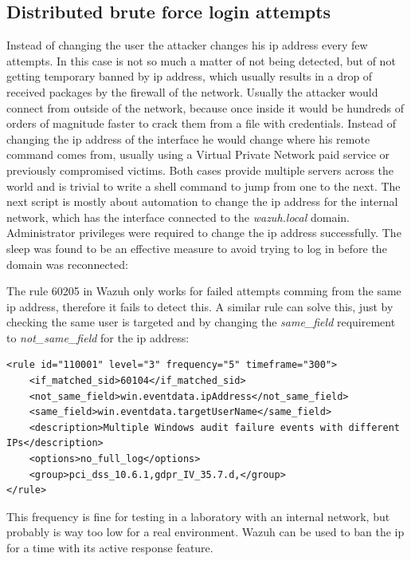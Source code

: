 \subsection{Distributed brute force login attempts}
Instead of changing the user the attacker changes his ip address every few attempts. In this case is not so much a matter of not being detected, but of not getting temporary banned by ip address, which usually results in a drop of received packages by the firewall of the network.
\linej
\linej
Usually the attacker would connect from outside of the network, because once inside it would be hundreds of orders of magnitude faster to crack them from a file with credentials.
Instead of changing the ip address of the interface he would change where his remote command comes from, usually using a Virtual Private Network paid service or previously compromised victims.
Both cases provide multiple servers across the world and is trivial to write a shell command to jump from one to the next.
\linej
The next script is mostly about automation to change the ip address for the internal network, which has the interface connected to the \textit{wazuh.local} domain.
Administrator privileges were required to change the ip address successfully. The sleep was found to be an effective measure to avoid trying to log in before the domain was reconnected:


\linej
The rule 60205 in Wazuh only works for failed attempts comming from the same ip address, therefore it fails to detect this. A similar rule can solve this, just by checking the same user is targeted and by changing the \textit{same\_field} requirement to \textit{not\_same\_field} for the ip address:
\begin{lstlisting}[style=xml]
<rule id="110001" level="3" frequency="5" timeframe="300">
	<if_matched_sid>60104</if_matched_sid>
	<not_same_field>win.eventdata.ipAddress</not_same_field>
	<same_field>win.eventdata.targetUserName</same_field>
	<description>Multiple Windows audit failure events with different IPs</description>
	<options>no_full_log</options>
	<group>pci_dss_10.6.1,gdpr_IV_35.7.d,</group>
</rule>
\end{lstlisting}
\linej
This frequency is fine for testing in a laboratory with an internal network, but probably is way too low for a real environment.
Wazuh can be used to ban the ip for a time with its active response feature\cite{active_response}.

